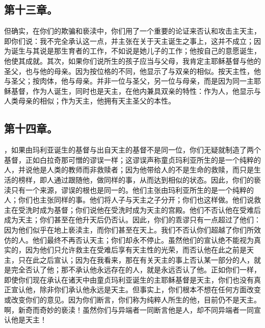 
\subsection{第十三章。}

\par

但确实，在你们的欺骗和亵渎中，你们用了一个重要的论证来否认和攻击主天主，即你们说：我不完全承认这一点，并主张在关于天主诞生之事上，这并不成立；因为诞生与其说是那生育者的工作，不如说是她儿子的工作；他按自己的意愿诞生，他使其成就。其次，如果你们说所生的孩子应当与父母，我肯定主耶稣基督与他的圣父，也与他的母亲。因为按位格的不同，他显示了与双亲的相似。按天主性，他与圣父；按肉体，他与母亲。并非一位与圣父，另一位与母亲，而是因为同一主耶稣基督，作为人诞生，同时也是天主，在他内兼具双亲的特性：作为人，他显示与人类母亲的相似；作为天主，他拥有天主圣父的本性。\par


\subsection{第十四章。}

\par

，如果由玛利亚诞生的基督与出自天主的基督不是同一位，你们无疑就制造了两个基督，正如白拉奇那可憎的谬误一样；这谬误声称童贞玛利亚所生的是一个纯粹的人，并说他是人类的教师而非救赎者；因为他带给人的不是生命的救赎，而只是生活的榜样，即人通过跟随他，做同样的事，从而达到相似的状态。因此，你们的亵渎只有一个来源，谬误的根也是同一的。他们主张由玛利亚所生的是一个纯粹的人；你们也主张同样的事。他们将人子与天主之子分开；你们也这样做。他们说救主在受洗时成为基督；你们说他在受洗时成为天主的宫殿。他们不否认他在受难后成为天主；你们甚至在他升天后仍否认。因此，你们的乖谬只有一点超过了他们：因为他们似乎在地上亵渎主，而你们甚至在天上。我们不否认你们超越了你们所效仿的人。他们最终不再否认天主；你们却永不停止。虽然他们的宣认绝不能视为真实的，因为他们只允许救主在受难后享有天主性的光荣，而否认他在此之前是天主，只在此之后宣认；因为在我看来，那在有关天主的事上否认某一部分的人，就是完全否认了他；那不承认他永远存在的人，就是永远否认了他。正如你们一样，即使你们现在承认在诸天中由童贞玛利亚诞生的主耶稣基督是天主，你们也没有真正宣认他，除非你们承认他永远是天主。但事实上，你们根本不想在任何方面改变或改变你们的意见。因为你们断言，你们称为纯粹人所生的他，目前仍不是天主。啊，新奇而奇妙的亵渎！虽然你们与异端者一同断言他是人，却不同异端者一同宣认他是天主！\par

